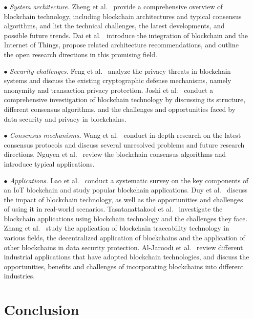 \documentclass[acmsmall]{acmart}
\begin{document}
$\bullet$ {\it System architecture.}
Zheng et al.~\cite{zheng2017overview} provide a comprehensive overview of blockchain technology, including blockchain architectures and typical consensus algorithms, and list the technical challenges, the latest developments, and possible future trends. Dai et al.~\cite{dai2019blockchain} introduce the integration of blockchain and the Internet of Things, propose related architecture recommendations, and outline the open research directions in this promising field. 

$\bullet$ {\it Security challenges.}
Feng et al.~\cite{feng2019survey} analyze the privacy threats in blockchain systems and discuss the existing cryptographic defense mechanisms, namely anonymity and transaction privacy protection. Joshi et al.~\cite{joshi2018survey} conduct a comprehensive investigation of blockchain technology by discussing its structure, different consensus algorithms, and the challenges and opportunities faced by data security and privacy in blockchains.

$\bullet$ {\it Consensus mechanisms.}
Wang et al.~\cite{wang2019survey} conduct in-depth research on the latest consensus protocols and discuss several unresolved problems and future research directions. Nguyen et al.~\cite{nguyen2018survey} review the blockchain consensus algorithms and introduce typical applications. 

$\bullet$ {\it Applications.}
Lao et al.~\cite{lao2020survey} conduct a systematic survey on the key components of an IoT blockchain and study popular blockchain applications. Duy et al.~\cite{duy2018survey} discuss the impact of blockchain technology, as well as the opportunities and challenges of using it in real-world scenarios. Tasatanattakool et al.~\cite{tasatanattakool2018blockchain} investigate the blockchain applications using blockchain technology and the challenges they face. Zhang et al.~\cite{zhang2020blockchain} study the application of blockchain traceability technology in various fields, the decentralized application of blockchains and the application of other blockchains in data security protection. Al-Jaroodi et al.~\cite{al2019blockchain} review different industrial applications that have adopted blockchain technologies, and discuss the opportunities, benefits and challenges of incorporating blockchains into different industries.

\section{Conclusion}
\label{sec:Conclusion}
\end{document}
